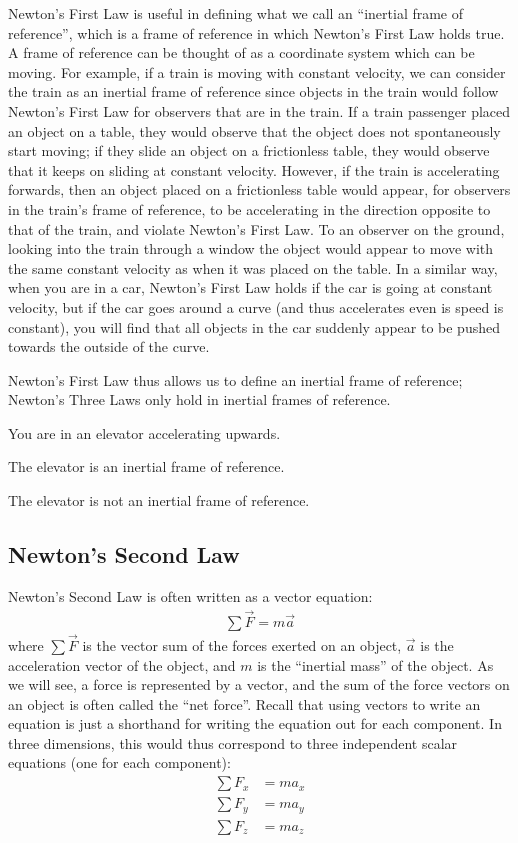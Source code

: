 Newton's First Law is useful in defining what we call an ``inertial frame of reference'', which is a frame of reference in which Newton's First Law holds true. A frame of reference can be thought of as a coordinate system which can be moving. For example, if a train is moving with constant velocity, we can consider the train as an inertial frame of reference since objects in the train would follow Newton's First Law for observers that are in the train. If a train passenger placed an object on a table, they would observe that the object does not spontaneously start moving; if they slide an object on a frictionless table, they would observe that it keeps on sliding at constant velocity. However, if the train is accelerating forwards, then an object placed on a frictionless table would appear, for observers in the train's frame of reference, to be accelerating in the direction opposite to that of the train, and violate Newton's First Law. To an observer on the ground, looking into the train through a window the object would appear to move with the same constant velocity as when it was placed on the table. In a similar way, when you are in a car, Newton's First Law holds if the car is going at constant velocity, but if the car goes around a curve (and thus accelerates even is speed is constant), you will find that all objects in the car suddenly appear to be pushed towards the outside of the curve.

Newton's First Law thus allows us to define an inertial frame of reference; Newton's Three Laws only hold in inertial frames of reference.

\begin{checkpoint}
\begin{MCquestion}{You are in an elevator accelerating upwards.}
\item The elevator is an inertial frame of reference.
\item The elevator is not an inertial frame of reference.%
\end{MCquestion}
\end{checkpoint}

\subsection{Newton's Second Law}
Newton's Second Law is often written as a vector equation:
\begin{align*}
\sum \vec F = m\vec a
\end{align*}
where $\sum \vec F$ is the vector sum of the forces exerted on an object, $\vec a$ is the acceleration vector of the object, and $m$ is the ``inertial mass'' of the object. As we will see, a force is represented by a vector, and the sum of the force vectors on an object is often called the ``net force''. Recall that using vectors to write an equation is just a shorthand for writing the equation out for each component. In three dimensions, this would thus correspond to three independent scalar equations (one for each component):
\begin{align*}
\sum F_x &= ma_x \\
\sum F_y &= ma_y \\
\sum F_z &= ma_z
\end{align*}

